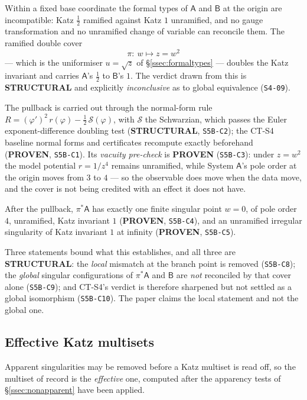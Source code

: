 Within a fixed base coordinate the formal types of $\mathsf A$ and $\mathsf B$
at the origin are incompatible: Katz $\tfrac12$ ramified against Katz $1$
unramified, and no gauge transformation and no unramified change of variable
can reconcile them. The ramified double cover
\begin{equation}\label{eq:cover}
  \pi:\ w\longmapsto z=w^2
\end{equation}
--- which is the uniformiser $u=\sqrt z$ of \S\ref{ssec:formaltypes} --- doubles
the Katz invariant and carries $\mathsf A$'s $\tfrac12$ to $\mathsf B$'s $1$.
The verdict drawn from this is \textbf{STRUCTURAL} and explicitly
\emph{inconclusive} as to global equivalence (\texttt{S4-09}).

The pullback is carried out through the normal-form rule
$R=(\varphi')^2\,r(\varphi)-\tfrac12\,\mathcal S(\varphi)$, with $\mathcal S$
the Schwarzian, which passes the Euler exponent-difference doubling test
(\textbf{STRUCTURAL}, \texttt{S5B-C2}); the CT-S4 baseline normal forms and
certificates recompute exactly beforehand (\textbf{PROVEN},
\texttt{S5B-C1}). Its \emph{vacuity pre-check} is \textbf{PROVEN}
(\texttt{S5B-C3}): under $z=w^2$ the model potential $r=1/z^4$ remains
unramified, while System $\mathsf A$'s pole order at the origin moves from $3$
to $4$ --- so the observable does move when the data move, and the cover is not
being credited with an effect it does not have.

After the pullback, $\pi^*\mathsf A$ has exactly one finite singular point
$w=0$, of pole order $4$, unramified, Katz invariant $1$ (\textbf{PROVEN},
\texttt{S5B-C4}), and an unramified irregular singularity of Katz invariant $1$
at infinity (\textbf{PROVEN}, \texttt{S5B-C5}).

Three statements bound what this establishes, and all three are
\textbf{STRUCTURAL}: the \emph{local} mismatch at the branch point is removed
(\texttt{S5B-C8}); the \emph{global} singular configurations of $\pi^*\mathsf A$
and $\mathsf B$ are \emph{not} reconciled by that cover alone
(\texttt{S5B-C9}); and CT-S4's verdict is therefore sharpened but not settled
as a global isomorphism (\texttt{S5B-C10}). The paper claims the local
statement and not the global one.

\subsection{Effective Katz multisets}\label{ssec:multisets}

Apparent singularities may be removed before a Katz multiset is read off, so
the multiset of record is the \emph{effective} one, computed after the
apparency tests of \S\ref{ssec:nonapparent} have been applied.

